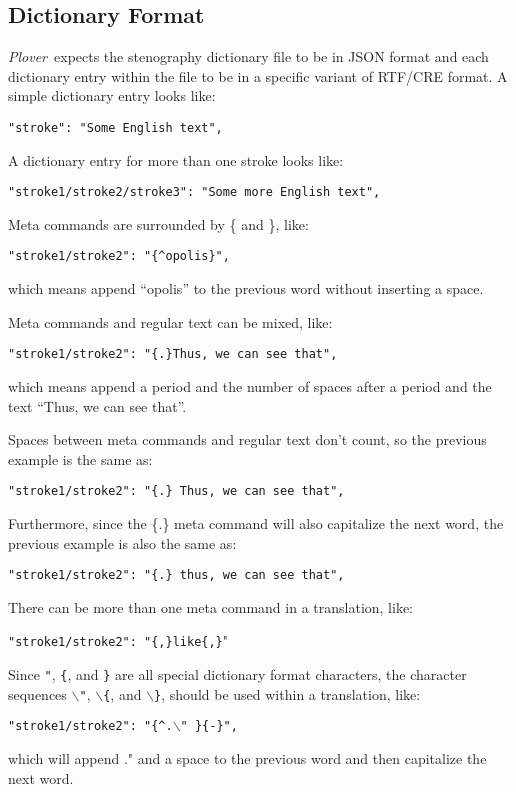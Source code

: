 \documentclass[11pt]{article}
\newcommand{\plover}{\emph{Plover}}
\newcommand{\code}[1]{\texttt{#1}}
\newcommand{\meta}[1]{\{#1\}}
\begin{document}
\subsection{Dictionary Format}
\plover~expects the stenography dictionary file to be in JSON format
and each dictionary entry within the file to be in a specific variant
of RTF/CRE format. A simple dictionary entry looks like:

\code{"stroke": "Some English text",}

A dictionary entry for more than one stroke looks like:

\code{"stroke1/stroke2/stroke3": "Some more English text",}

Meta commands are surrounded by \{ and \}, like:

\code{"stroke1/stroke2": "\meta{\^{ }opolis}",}

which means append ``opolis'' to the previous word without inserting a space.

Meta commands and regular text can be mixed, like:

\code{"stroke1/stroke2": "\meta{.}Thus, we can see that",}

which means append a period and the number of spaces after a period
and the text ``Thus, we can see that''.

Spaces between meta commands and regular text don't count, so the previous example is the same as:

\code{"stroke1/stroke2": "\meta{.} Thus, we can see that",}

Furthermore, since the \meta{.} meta command will also capitalize the next word, the previous example is also the same as:

\code{"stroke1/stroke2": "\meta{.} thus, we can see that",}

There can be more than one meta command in a translation, like:

\code{"stroke1/stroke2": "\meta{,}like\meta{,}}"

Since \code{"}, \code{\{}, and \code{\}} are all special dictionary format characters, the
character sequences \code{$\backslash$"}, \code{$\backslash$\{}, and \code{$\backslash$\}}, should be used within a
translation, like:

\code{"stroke1/stroke2": "\meta{\^{ }.$\backslash$"~}\meta{-\textbar}",}

which will append ." and a space to the previous word and then
capitalize the next word.
\end{document}
